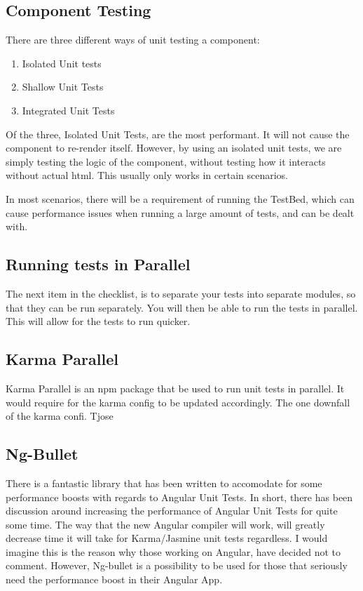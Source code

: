 \subsection{ Component Testing }
There are three different ways of unit testing a component:
\begin{enumerate}
  \item Isolated Unit tests
  \item Shallow Unit Tests
  \item Integrated Unit Tests
\end{enumerate}

Of the three, Isolated Unit Tests, are the most performant. It will not cause
the component to re-render itself. However, by using an isolated unit tests,
we are simply testing the logic of the component, without testing how it
interacts without actual html. This usually only works in certain scenarios.

In most scenarios, there will be a requirement of running the TestBed, which
can cause performance issues when running a large amount of tests, and can be
dealt with.

\subsection{ Running tests in Parallel }
The next item in the checklist, is to separate your tests into separate modules,
so that they can be run separately. You will then be able to run the tests in
parallel. This will allow for the tests to run quicker.

\subsection{ Karma Parallel }
Karma Parallel is an npm package that be used to run unit tests in parallel. It
would require for the karma config to be updated accordingly. The one downfall
of the karma confi. Tjose

\subsection{ Ng-Bullet }
There is a fantastic library that has been written to accomodate for some
performance boosts with regards to Angular Unit Tests. In short, there has been
discussion around increasing the performance of Angular Unit Tests for quite
some time. The way that the new Angular compiler will work, will greatly
decrease time it will take for Karma/Jasmine unit tests regardless. I would
imagine this is the reason why those working on Angular, have decided not to
comment. However, Ng-bullet is a possibility to be used for those that seriously
need the performance boost in their Angular App.

